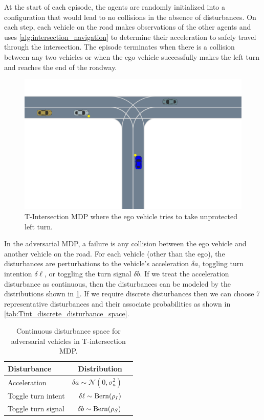At the start of each episode, the agents are randomly initialized into a configuration that would lead to no collisions in the absence of disturbances. On each step, each vehicle on the road makes observations of the other agents and uses \cref{alg:intersection_navigation} to determine their acceleration to safely travel through the intersection. The episode terminates when there is a collision between any two vehicles or when the ego vehicle successfully makes the left turn and reaches the end of the roadway. 

\begin{figure}
    \centering
    \includegraphics[trim={0 5cm 0 0},clip, width=\textwidth]{figures/sample_systems/T_intersection.pdf}
    \caption{T-Intersection MDP where the ego vehicle tries to take unprotected left turn. }
    \label{fig:t_intersection}
\end{figure}

In the adversarial MDP, a failure is any collision between the ego vehicle and another vehicle on the road. For each vehicle (other than the ego), the disturbances are perturbations to the vehicle's acceleration $\delta a$, toggling turn intention $\delta \ell$, or toggling the turn signal $\delta b$. If we treat the acceleration disturbance as continuous, then the disturbances can be modeled by the distributions shown in \cref{tab:Tint_continuous_disturbance_space}. If we require discrete disturbances then we can choose \num{7} representative disturbances and their associate probabilities as shown in \cref{tab:Tint_discrete_disturbance_space}.

\begin{table}
    \centering
    \caption{Continuous disturbance space for adversarial vehicles in T-intersection MDP.}
    \label{tab:Tint_continuous_disturbance_space}
    \begin{tabular}{@{}lrr@{}} 
        \toprule
        \textbf{Disturbance} & \textbf{Distribution} \\
        \midrule
        Acceleration &  $\delta a \sim \mathcal{N}(0, \sigma_a^2)$ \\
        Toggle turn intent & $\delta \ell \sim {\rm Bern}(\rho_I)$ \\
        Toggle turn signal & $\delta b \sim {\rm Bern}(\rho_S)$\\
        \bottomrule
    \end{tabular}
\end{table}

